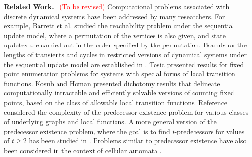 \noindent
\textbf{Related Work.}~ \textcolor{red}{(To be revised)}
Computational problems associated with 
discrete dynamical systems 
have been addressed by many researchers.
For example, Barrett et al. \cite{BH+06} studied the
reachability problem under the sequential
update model, where a permutation of the vertices is also given,
and state updates are carried out in the order specified by the
permutation.  
Bounds on the lengths of transients and cycles in restricted versions
of dynamical systems under the sequential update model are established
in \cite{MR-2007}.  
Tosic \cite{Tos-2010,Tosic-2017} presented results for fixed point enumeration
problems for systems with special forms of local transition
functions.  Kosub and Homan \cite{KH-2007} presented dichotomy
results that delineate computationally intractable and efficiently
solvable versions of counting fixed points, based on the class of
allowable local transition functions.  
Reference \cite{BH+07} considered the complexity
of the predecessor existence problem for various classes
of underlying graphs and local functions.
A more general version of the predecessor existence problem,
where the goal is to find $t$-predecessors for values of $t \geq 2$
has been studied in \cite{Kawachi-et-al-2017,MR+2018}.
Problems similar to predecessor existence have
also been considered in the context of cellular automata
\cite{Gre-1987,Dur-1994}.
